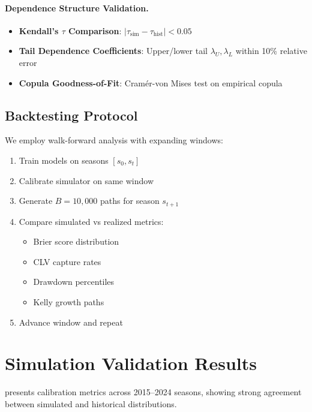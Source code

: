 \paragraph{Dependence Structure Validation.}
\begin{itemize}
  \item \textbf{Kendall's $\tau$ Comparison}: $|\tau_{\text{sim}} - \tau_{\text{hist}}| < 0.05$
  \item \textbf{Tail Dependence Coefficients}: Upper/lower tail $\lambda_U, \lambda_L$ within 10\% relative error
  \item \textbf{Copula Goodness-of-Fit}: Cramér-von Mises test on empirical copula
\end{itemize}

\subsection{Backtesting Protocol}

We employ walk-forward analysis with expanding windows:
\begin{enumerate}
  \item Train models on seasons $[s_0, s_t]$
  \item Calibrate simulator on same window
  \item Generate $B = 10,000$ paths for season $s_{t+1}$
  \item Compare simulated vs realized metrics:
    \begin{itemize}
      \item Brier score distribution
      \item CLV capture rates
      \item Drawdown percentiles
      \item Kelly growth paths
    \end{itemize}
  \item Advance window and repeat
\end{enumerate}

\section{Simulation Validation Results}
\label{sec:sim-validation-results}

 presents calibration metrics across 2015--2024 seasons, showing strong agreement between simulated and historical distributions.

